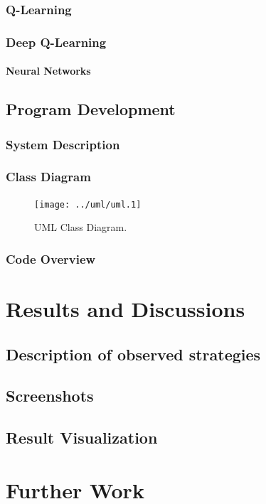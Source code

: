 \documentclass[a4paper,11pt]{article}
\begin{document}
			\subsubsection{Q-Learning}
			\subsubsection{Deep Q-Learning}
				\paragraph{Neural Networks}

		\subsection{Program Development}
			\subsubsection{System Description}
			\subsubsection{Class Diagram}
				\begin{figure}[!h]
					\begin{centering}
						\texttt{[image: ../uml/uml.1]}
						\caption{UML Class Diagram.}
					\end{centering}
				\end{figure}
			\subsubsection{Code Overview}

	\section{Results and Discussions}
		\subsection{Description of observed strategies}
		\subsection{Screenshots}
		\subsection{Result Visualization}

	\section{Further Work}
\end{document}
